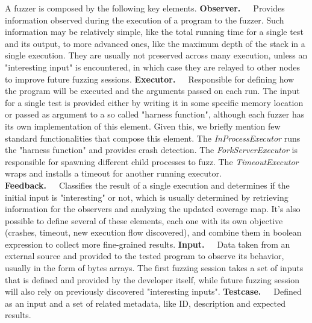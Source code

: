 A fuzzer is composed by the following key elements. \cite{afl_docs}
\newline \newline
\textbf{Observer.}\ \ \ Provides information observed during the execution of a program to the fuzzer. Such information may be relatively simple, like the total running time for a single test and its output, to more advanced ones, like the maximum depth of the stack in a single execution. They are usually not preserved across many execution, unless an "interesting input" is encountered, in which case they are relayed to other nodes to improve future fuzzing sessions. 
\newline \newline
\textbf{Executor.}\ \ \ Responsible for defining how the program will be executed and the arguments passed on each run. The input for a single test is provided either by writing it in some specific memory location or passed as argument to a so called "harness function", although each fuzzer has its own implementation of this element. Given this, we briefly mention few standard functionalities that compose this element. The \textit{InProcessExecutor} runs the "harness function" and provides crash detection. The \textit{ForkServerExecutor} is responsible for spawning different child processes to fuzz. The \textit{TimeoutExecutor} wraps and installs a timeout for another running executor.
\newline \newline
\textbf{Feedback.}\ \ \ Classifies the result of a single execution and determines if the initial input is "interesting" or not, which is usually determined by retrieving information for the observers and analyzing the updated coverage map. It's also possible to define several of these elements, each one with its own objective (crashes, timeout, new execution flow discovered), and combine them in boolean expression to collect more fine-grained results.
\newline \newline
\textbf{Input.}\ \ \ Data taken from an external source and provided to the tested program to observe its behavior, usually in the form of bytes arrays. The first fuzzing session takes a set of inputs that is defined and provided by the developer itself, while future fuzzing session will also rely on previously discovered "interesting inputs". 
\newline \newline
\textbf{Testcase.}\ \ \ Defined as an input and a set of related metadata, like ID, description and expected results.
